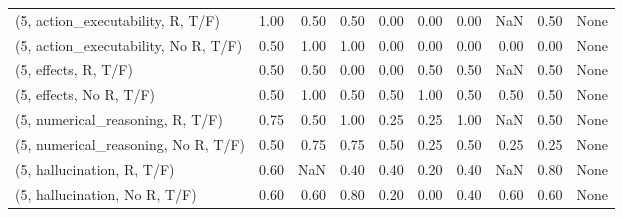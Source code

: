 \begin{table*}[h!]
\begin{adjustbox}{width=2\columnwidth,center}
\begin{tabular}{lrrr|rrr|rrr}
(5, action\_executability, R, T/F)    &                      1.00 &                  0.50 &                      0.50 &                          0.00 &                      0.00 &                          0.00 &                                    NaN &                               0.50 &                                  None \\
(5, action\_executability, No R, T/F) &                      0.50 &                  1.00 &                      1.00 &                          0.00 &                      0.00 &                          0.00 &                                   0.00 &                               0.00 &                                  None \\
(5, effects, R, T/F)                 &                      0.50 &                  0.50 &                      0.00 &                          0.00 &                      0.50 &                          0.50 &                                    NaN &                               0.50 &                                  None \\
(5, effects, No R, T/F)              &                      0.50 &                  1.00 &                      0.50 &                          0.50 &                      1.00 &                          0.50 &                                   0.50 &                               0.50 &                                  None \\
(5, numerical\_reasoning, R, T/F)     &                      0.75 &                  0.50 &                      1.00 &                          0.25 &                      0.25 &                          1.00 &                                    NaN &                               0.50 &                                  None \\
(5, numerical\_reasoning, No R, T/F)  &                      0.50 &                  0.75 &                      0.75 &                          0.50 &                      0.25 &                          0.50 &                                   0.25 &                               0.25 &                                  None \\
(5, hallucination, R, T/F)           &                      0.60 &                   NaN &                      0.40 &                          0.40 &                      0.20 &                          0.40 &                                    NaN &                               0.80 &                                  None \\
(5, hallucination, No R, T/F)        &                      0.60 &                  0.60 &                      0.80 &                          0.20 &                      0.00 &                          0.40 &                                   0.60 &                               0.60 &                                  None \\

\end{tabular}
\end{adjustbox}
\end{table*}
